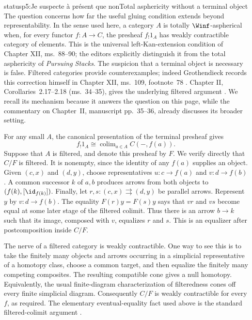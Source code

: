 \begin{dcomment}{status}{p5:Je suspecte à présent que non}{Total asphericity without a terminal object}
The question concerns how far the useful gluing condition extends beyond representability. In the sense used here, a category \(A\) is totally \(\Winf\)-aspherical when, for every functor \(f:A\to C\), the presheaf \(f_!1_A\) has weakly contractible category of elements. This is the universal left-Kan-extension condition of Chapter XII, ms.~88--90; the editors explicitly distinguish it from the total asphericity of \emph{Pursuing Stacks}. The suspicion that a terminal object is necessary is false. Filtered categories provide counterexamples; indeed Grothendieck records this correction himself in Chapter XII, ms.~109, footnote~78 \citep{Grothendieck1990XII}. Chapter II, Corollaries~2.17--2.18 (ms.~34--35), gives the underlying filtered argument \citep{Grothendieck1990II}. We recall its mechanism because it answers the question on this page, while the commentary on Chapter~II, manuscript pp.~35--36, already discusses its broader setting.

For any small \(A\), the canonical presentation of the terminal presheaf gives
\[
  f_!1_A\cong\mathop{\mathrm{colim}}_{a\in A}C(-,f(a)).
\]
Suppose that \(A\) is filtered, and denote this presheaf by \(F\). We verify directly that \(C/F\) is filtered. It is nonempty, since the identity of any \(f(a)\) supplies an object. Given \((c,x)\) and \((d,y)\), choose representatives \(u:c\to f(a)\) and \(v:d\to f(b)\). A common successor \(k\) of \(a,b\) produces arrows from both objects to \((f(k),[\id_{f(k)}])\). Finally, let \(r,s:(c,x)\rightrightarrows(d,y)\) be parallel arrows. Represent \(y\) by \(v:d\to f(b)\). The equality \(F(r)y=F(s)y\) says that \(vr\) and \(vs\) become equal at some later stage of the filtered colimit. Thus there is an arrow \(b\to k\) such that its image, composed with \(v\), equalizes \(r\) and \(s\). This is an equalizer after postcomposition inside \(C/F\).

The nerve of a filtered category is weakly contractible. One way to see this is to take the finitely many objects and arrows occurring in a simplicial representative of a homotopy class, choose a common target, and then equalize the finitely many competing composites. The resulting compatible cone gives a null homotopy. Equivalently, the usual finite-diagram characterization of filteredness cones off every finite simplicial diagram. Consequently \(C/F\) is weakly contractible for every \(f\), as required. The elementary eventual-equality fact used above is the standard filtered-colimit argument \citep[\S4.19]{StacksFiltered}.


\end{dcomment}

